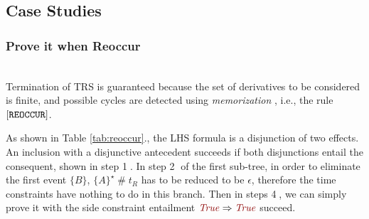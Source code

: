 \documentclass[acmsmall,10pt,review]{acmart}
\newcommand{\effect}{{\ensuremath{\mathrm{\Phi}}}}
\newcommand{\code}[1]{{\tt{\ensuremath{\m{#1}}}}}
\newcommand{\codeme}[1]{{\tt{\ensuremath{#1}}}}
\newcommand{\CONTAIN}{\sqsubseteq}
\newcommand{\m}{\mathit}
\newcommand{\mysharp}{{\mathrel{\texttt{\#}}}}
\newcommand\tabref[1]{Table \textcolor{black}{\ref{#1}}.}
\begin{document}
{\subsection{Case Studies}
\label{subsec:Case_Studies}











\subsubsection{Prove it when Reoccur}~\\

Termination of TRS is guaranteed because the set of derivatives 
to be considered is finite, and possible cycles are detected 
using \emph{memorization} \cite{DBLP:conf/tableaux/Brotherston05}, 
i.e., the rule $\codeme{[REOCCUR]}$. 



As shown in \tabref{tab:reoccur}, the LHS formula is a 
disjunction of two effects. An inclusion with a disjunctive 
antecedent succeeds if both disjunctions entail the consequent, 
shown in step {\textcircled{1}}.  
In step \textcircled{2} of the first sub-tree, in order to eliminate the first event \code{\{B\}}, \code{\{A\}^\star \mysharp  t_R} has to be reduced to be \code{\epsilon}, therefore the time constraints have nothing to do in this branch. 
Then in steps \textcircled{4}, we
can simply prove it with the side constraint entailment \code{\textcolor {darkred}{True} \Rightarrow  \textcolor {darkred}{True}} succeed.


}
\end{document}
